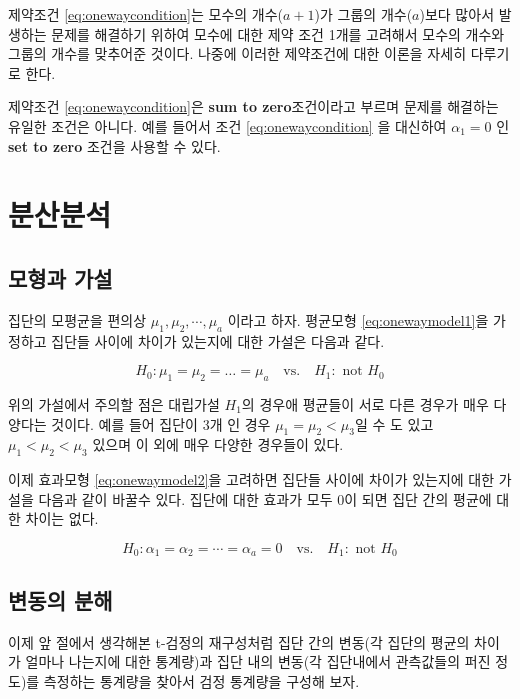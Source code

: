 \documentclass[
]{book}
\begin{document}
제약조건 \eqref{eq:onewaycondition}는 모수의 개수(\(a+1\))가 그룹의 개수(\(a\))보다 많아서 발생하는 문제를 해결하기 위하여 모수에 대한 제약 조건 1개를 고려해서 모수의 개수와 그룹의 개수를 맞추어준 것이다. 나중에 이러한 제약조건에 대한 이론을 자세히 다루기로 한다.

제약조건 \eqref{eq:onewaycondition}은 \textbf{sum to zero}조건이라고 부르며 문제를 해결하는 유일한 조건은 아니다. 예를 들어서 조건 \eqref{eq:onewaycondition} 을 대신하여
\(\alpha_1=0\) 인 \textbf{set to zero} 조건을 사용할 수 있다.

\hypertarget{oneway2}{%
\chapter{분산분석}\label{oneway2}}

\hypertarget{uxbaa8uxd615uxacfc-uxac00uxc124}{%
\section{모형과 가설}\label{uxbaa8uxd615uxacfc-uxac00uxc124}}

집단의 모평균을 편의상 \(\mu_1, \mu_2, \cdots, \mu_a\) 이라고 하자. 평균모형 \eqref{eq:onewaymodel1}을 가정하고 집단들 사이에 차이가 있는지에 대한 가설은 다음과 같다.

\[ H_0: \mu_1 = \mu_2 =\dots =\mu_a \quad \text{vs.} \quad H_1: \text{ not } H_0 \]

위의 가설에서 주의할 점은 대립가설 \(H_1\)의 경우애 평균들이 서로 다른 경우가 매우 다양다는 것이다. 예를 들어 집단이 3개 인 경우 \(\mu_1 = \mu_2 < \mu_3\)일 수 도 있고
\(\mu_1 < \mu_2 < \mu_3\) 있으며 이 외에 매우 다양한 경우들이 있다.

이제 효과모형 \eqref{eq:onewaymodel2}을 고려하면 집단들 사이에 차이가 있는지에 대한 가설을 다음과 같이 바꿀수 있다. 집단에 대한 효과가 모두 0이 되면 집단 간의 평균에 대한 차이는 없다.

\begin{equation}
H_0: \alpha_1 = \alpha_2 =\cdots=\alpha_a =0  \quad \text{vs.} \quad H_1: \text{ not } H_0 
\label{eq:hypo1}
\end{equation}

\hypertarget{uxbcc0uxb3d9uxc758-uxbd84uxd574}{%
\section{변동의 분해}\label{uxbcc0uxb3d9uxc758-uxbd84uxd574}}

이제 앞 절에서 생각해본 t-검정의 재구성처럼 집단 간의 변동(각 집단의 평균의 차이가 얼마나 나는지에 대한 통계량)과 집단 내의 변동(각 집단내에서 관측값들의 퍼진 정도)를 측정하는 통계량을 찾아서 검정 통계량을 구성해 보자.
\end{document}
